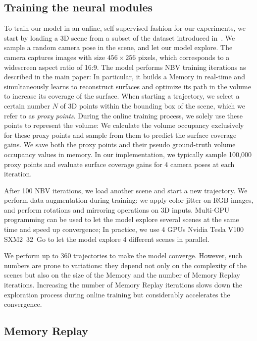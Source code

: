 \subsection{Training the neural modules}
To train our model in an online, self-supervised fashion for our experiments, we start by loading a 3D scene from a subset of the dataset introduced in~\cite{guedon-nips22-scone-surface-coverage}. 
We sample a random camera pose in the scene, and let our model explore. The camera captures images with size $456\times 256$ pixels, which corresponds to a widescreen aspect ratio of 16:9. The model performs NBV training iterations as described in the main paper: In particular, it builds a Memory in real-time and simultaneously learns to reconstruct surfaces and optimize its path in the volume to increase its coverage of the surface.
When starting a trajectory, we select a certain number $N$ of 3D points within the bounding box of the scene, which we refer to as \emph{proxy points}. During the online training process, we solely use these points to represent the volume: We calculate the volume occupancy exclusively for these proxy points and sample from them to predict the surface coverage gains. We save both the proxy points and their pseudo ground-truth volume occupancy values in memory. In our implementation, we typically sample 100,000 proxy points and evaluate surface coverage gains for 4 camera poses at each iteration.

After 100 NBV iterations, we load another scene and start a new trajectory. 
We perform data augmentation during training: we apply color jitter on RGB images, and perform rotations and mirroring operations on 3D inputs. 
%
Multi-GPU programming can be used to let the model explore several scenes at the same time and speed up convergence; In practice, we use 4 GPUs Nvidia Tesla V100 SXM2~32~Go to let the model explore 4 different scenes in parallel.

We perform up to 360 trajectories to make the model converge. However, such numbers are prone to variations: they depend not only on the complexity of the scenes but also on the size of the Memory and the number of Memory Replay iterations. 
Increasing the number of Memory Replay iterations slows down the exploration process during online training but considerably accelerates the convergence.

\subsection{Memory Replay} 

